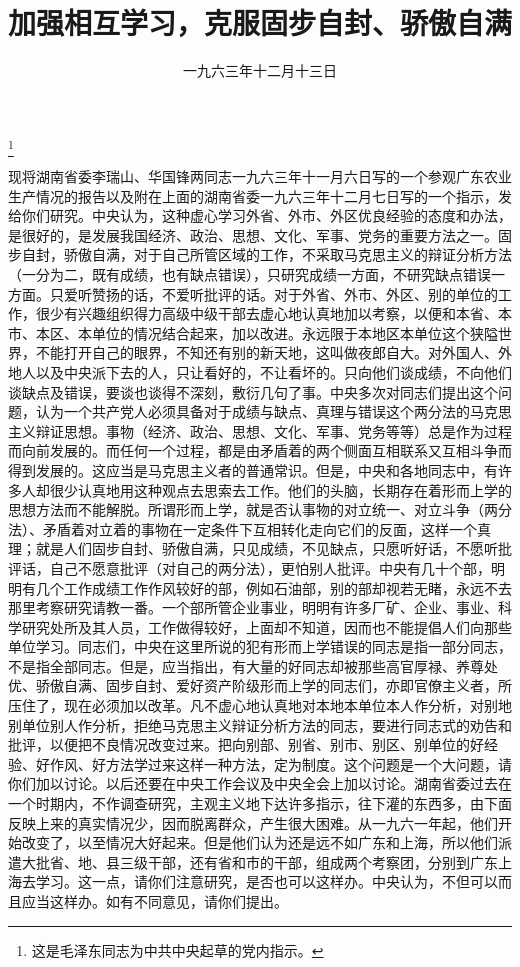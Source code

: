 
\title{加强相互学习，克服固步自封、骄傲自满}
\date{一九六三年十二月十三日}
\thanks{这是毛泽东同志为中共中央起草的党内指示。}
\maketitle



现将湖南省委李瑞山、华国锋两同志一九六三年十一月六日写的一个参观广东农业生产情况的报告以及附在上面的湖南省委一九六三年十二月七日写的一个指示，发给你们研究。中央认为，这种虚心学习外省、外市、外区优良经验的态度和办法，是很好的，是发展我国经济、政治、思想、文化、军事、党务的重要方法之一。固步自封，骄傲自满，对于自己所管区域的工作，不采取马克思主义的辩证分析方法（一分为二，既有成绩，也有缺点错误），只研究成绩一方面，不研究缺点错误一方面。只爱听赞扬的话，不爱听批评的话。对于外省、外市、外区、别的单位的工作，很少有兴趣组织得力高级中级干部去虚心地认真地加以考察，以便和本省、本市、本区、本单位的情况结合起来，加以改进。永远限于本地区本单位这个狭隘世界，不能打开自己的眼界，不知还有别的新天地，这叫做夜郎自大。对外国人、外地人以及中央派下去的人，只让看好的，不让看坏的。只向他们谈成绩，不向他们谈缺点及错误，要谈也谈得不深刻，敷衍几句了事。中央多次对同志们提出这个问题，认为一个共产党人必须具备对于成绩与缺点、真理与错误这个两分法的马克思主义辩证思想。事物（经济、政治、思想、文化、军事、党务等等）总是作为过程而向前发展的。而任何一个过程，都是由矛盾着的两个侧面互相联系又互相斗争而得到发展的。这应当是马克思主义者的普通常识。但是，中央和各地同志中，有许多人却很少认真地用这种观点去思索去工作。他们的头脑，长期存在着形而上学的思想方法而不能解脱。所谓形而上学，就是否认事物的对立统一、对立斗争（两分法）、矛盾着对立着的事物在一定条件下互相转化走向它们的反面，这样一个真理；就是人们固步自封、骄傲自满，只见成绩，不见缺点，只愿听好话，不愿听批评话，自己不愿意批评（对自己的两分法），更怕别人批评。中央有几十个部，明明有几个工作成绩工作作风较好的部，例如石油部，别的部却视若无睹，永远不去那里考察研究请教一番。一个部所管企业事业，明明有许多厂矿、企业、事业、科学研究处所及其人员，工作做得较好，上面却不知道，因而也不能提倡人们向那些单位学习。同志们，中央在这里所说的犯有形而上学错误的同志是指一部分同志，不是指全部同志。但是，应当指出，有大量的好同志却被那些高官厚禄、养尊处优、骄傲自满、固步自封、爱好资产阶级形而上学的同志们，亦即官僚主义者，所压住了，现在必须加以改革。凡不虚心地认真地对本地本单位本人作分析，对别地别单位别人作分析，拒绝马克思主义辩证分析方法的同志，要进行同志式的劝告和批评，以便把不良情况改变过来。把向别部、别省、别市、别区、别单位的好经验、好作风、好方法学过来这样一种方法，定为制度。这个问题是一个大问题，请你们加以讨论。以后还要在中央工作会议及中央全会上加以讨论。湖南省委过去在一个时期内，不作调查研究，主观主义地下达许多指示，往下灌的东西多，由下面反映上来的真实情况少，因而脱离群众，产生很大困难。从一九六一年起，他们开始改变了，以至情况大好起来。但是他们认为还是远不如广东和上海，所以他们派遣大批省、地、县三级干部，还有省和市的干部，组成两个考察团，分别到广东上海去学习。这一点，请你们注意研究，是否也可以这样办。中央认为，不但可以而且应当这样办。如有不同意见，请你们提出。

